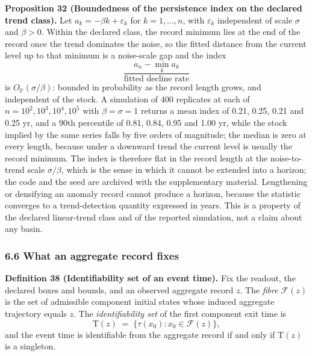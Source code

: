 \documentclass[11pt]{article}
\begin{document}
\textbf{Proposition 32 (Boundedness of the persistence index on the declared trend class).} Let
\(a_k=-\beta k+\varepsilon_k\) for \(k=1,\dots,n\), with \(\varepsilon_k\) independent of scale
\(\sigma\) and \(\beta>0\). Within the declared class, the record minimum lies at the end of the
record once the trend dominates the noise, so the fitted distance from the current level up to that
minimum is a noise-scale gap and the index
\[ \frac{a_n-\min_ka_k}{\text{fitted decline rate}} \]
is \(O_{\mathbb P}(\sigma/\beta)\): bounded in probability as the record length grows, and
independent of the stock. A simulation of 400 replicates at each of \(n=10^2,10^3,10^4,10^5\) with
\(\beta=\sigma=1\) returns a mean index of 0.21, 0.25, 0.21 and 0.25 yr, and a 90th percentile of
0.81, 0.84, 0.95 and 1.00 yr, while the stock implied by the same series falls by five orders of
magnitude; the median is zero at every length, because under a downward trend the current level is
usually the record minimum. The index is therefore flat in the record length at the noise-to-trend
scale \(\sigma/\beta\), which is the sense in which it cannot be extended into a horizon; the code
and the seed are archived with the supplementary material. Lengthening or densifying an anomaly
record cannot produce a horizon, because the statistic converges to a trend-detection quantity
expressed in years. This is a property of the declared linear-trend class and of the reported
simulation, not a claim about any basin.



\subsubsection{6.6 What an aggregate record fixes}\label{what-an-aggregate-record-fixes}

\textbf{Definition 38 (Identifiability set of an event time).} Fix the readout, the declared boxes and
bounds, and an observed aggregate record \(z\). The \emph{fibre} \(\mathcal F(z)\) is the set of admissible
component initial states whose induced aggregate trajectory equals \(z\). The \emph{identifiability set} of
the first component exit time is
\[
\mathrm T(z) \;=\; \bigl\{\tau(x_0) : x_0 \in \mathcal F(z)\bigr\},
\]
and the event time is identifiable from the aggregate record if and only if \(\mathrm T(z)\) is a
singleton.
\end{document}
